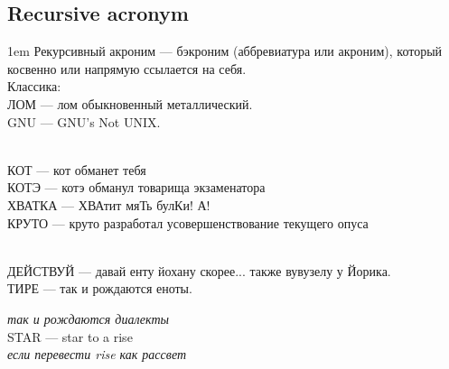 \subsection{Recursive acronym}
\begin{flushleft}\parskip1em
Рекурсивный акроним --- бэкроним (аббревиатура или акроним), который косвенно или напрямую ссылается на себя.\\
Классика:\\
ЛОМ --- лом обыкновенный металлический.\\
GNU --- GNU's Not UNIX.

\emph{}\\
КОТ --- кот обманет тебя\\
КОТЭ --- котэ обманул товарища экзаменатора\\
ХВАТКА --- ХВАтит мяТь булКи! А!\\
КРУТО --- круто разработал усовершенствование текущего опуса

\emph{}\\
ДЕЙСТВУЙ --- давай енту йохану скорее... также вувузелу у Йорика.\\
ТИРЕ --- так и рождаются еноты.

\emph{так и рождаются диалекты}\\
STAR --- star to a rise\\
\emph{если перевести rise как рассвет}
\end{flushleft}
